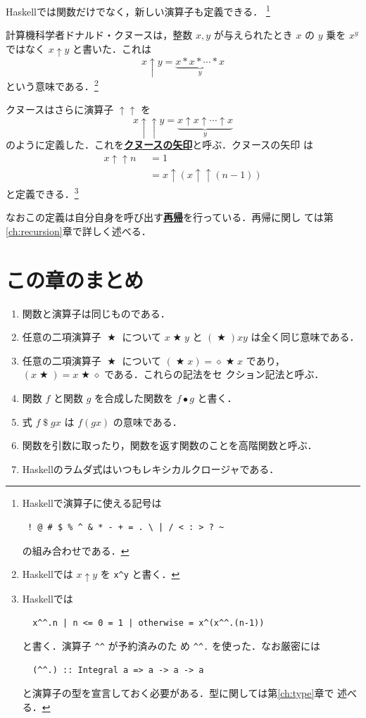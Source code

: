 \documentclass[a5paper,twoside,fleqn,draft]{jsbook}
\newcommand{\programminglanguage}[1]{\textsf{#1}}
\newcommand{\haskell}{\programminglanguage{Haskell}}
\newcommand{\keyword}[1]{{\underline{\textbf{#1}}}}
\newcommand{\code}[1]{\texttt{#1}}
\newcommand{\mKeyword}[1]{\mathsf{#1}}
\newcommand{\mOtherwiseKeyword}{\mKeyword{otherwise}}
\DeclareMathOperator{\mOtherwise}{\mOtherwiseKeyword}
\newcommand{\mAnonParam}{\diamond}
\DeclareMathOperator{\mApply}{\$}
\DeclareMathOperator{\mBinOp}{\bigstar}
\DeclareMathOperator{\mComp}{\bullet}
\newcommand{\mGuard}[1]{\mathop{\mid_{#1}}}
\begin{document}
\haskell では関数だけでなく，新しい演算子も定義できる．
\footnote{\haskell で演算子に使える記号は
\begin{verbatim}
 ! @ # $ % ^ & * - + = . \ | / < : > ? ~
\end{verbatim}%
の組み合わせである．}


計算機科学者ドナルド・クヌースは，整数 $x,y$ が与えられたとき $x$ の
$y$ 乗を $x^y$ ではなく $x\uparrow y$ と書いた．これは
\begin{equation}
  x\uparrow y
  =\underbrace{x*x*\dotsb*x}_{y}
\end{equation}
という意味である．\footnote{\haskell では $x\uparrow y$ を
  \code{x\textasciicircum y} と書く．}

クヌースはさらに演算子 $\uparrow\uparrow$ を
\begin{equation}
  x\uparrow\uparrow y
  =\underbrace{x\uparrow x\uparrow\dotsb\uparrow x}_{y}
\end{equation}
のように定義した．これを\keyword{クヌースの矢印}と呼ぶ．クヌースの矢印
は
\begin{align}
  x\uparrow\uparrow n
  &\mGuard{n\le0}=1\\
  &\mGuard{\mOtherwise}
  =x\uparrow(x\uparrow\uparrow(n-1))
\end{align}
と定義できる．\footnote{\haskell では
\begin{verbatim}
  x^^.n | n <= 0 = 1 | otherwise = x^(x^^.(n-1))
\end{verbatim}
と書く．演算子 \code{\textasciicircum\textasciicircum} が予約済みのた
め \code{\textasciicircum\textasciicircum.} を使った．なお厳密には
\begin{verbatim}
  (^^.) :: Integral a => a -> a -> a
\end{verbatim}
と演算子の型を宣言しておく必要がある．型に関しては第\ref{ch:type}章で
述べる．}

なおこの定義は自分自身を呼び出す\keyword{再帰}を行っている．再帰に関し
ては第\ref{ch:recursion}章で詳しく述べる．

\section{この章のまとめ}

\begin{enumerate}
\item 関数と演算子は同じものである．\item 任意の二項演算子 $\mBinOp$
  について $x\mBinOp y$ と $(\mBinOp)xy$ は全く同じ意味である．\item
  任意の二項演算子 $\mBinOp$ について $(\mBinOp x)=\mAnonParam\mBinOp
  x$ であり，$(x\mBinOp)=x\mBinOp\mAnonParam$ である．これらの記法をセ
  クション記法と呼ぶ．\item 関数 $f$ と関数 $g$ を合成した関数を
  $f\mComp g$ と書く．\item 式 $f\mApply gx$ は $f(gx)$ の意味である．
\item 関数を引数に取ったり，関数を返す関数のことを高階関数と呼ぶ．
\item \haskell のラムダ式はいつもレキシカルクロージャである．
\end{enumerate}
\end{document}
